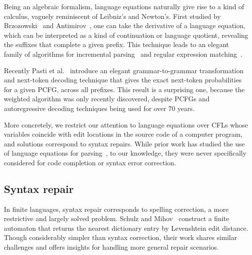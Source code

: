 \documentclass[popl.tex]{subfiles}
\begin{document}
Being an algebraic formalism, language equations naturally give rise to a kind of calculus, vaguely reminiscent of Leibniz's and Newton's. First studied by Brzozowski~\cite{brzozowski1964derivatives, brzozowski1980equations} and Antimirov~\cite{antimirov1996partial}, one can take the derivative of a language equation, which can be interpreted as a kind of continuation or language quotient, revealing the suffixes that complete a given prefix. This technique leads to an elegant family of algorithms for incremental parsing~\cite{might2011parsing, adams2016complexity} and regular expression matching~\cite{stanford2021symbolic,varatalu2025re}.

Recently Pasti et al.~\cite{pasti2026prefix} introduce an elegant grammar-to-grammar transformation and next-token decoding technique that gives the exact next-token probabilities for a given PCFG, across all prefixes. This result is a surprising one, because the weighted algorithm was only recently discovered, despite PCFGs and autoregressive decoding techniques being used for over 70 years.


More concretely, we restrict our attention to language equations over CFLs whose variables coincide with edit locations in the source code of a computer program, and solutions correspond to syntax repairs. While prior work has studied the use of language equations for parsing~\cite{might2011parsing}, to our knowledge, they were never specifically considered for code completion or syntax error correction.

\subsection{Syntax repair}

In finite languages, syntax repair corresponds to spelling correction, a more restrictive and largely solved problem. Schulz and Mihov~\cite{schulz2002fast} construct a finite automaton that returns the nearest dictionary entry by Levenshtein edit distance. Though considerably simpler than syntax correction, their work shares similar challenges and offers insights for handling more general repair scenarios.
\end{document}
